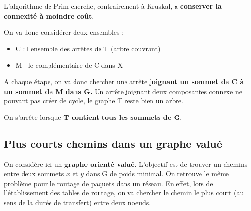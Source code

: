 L'algorithme de Prim cherche, contrairement à Kruskal, à \textbf{conserver la connexité à moindre coût}. 

On va donc considérer deux ensembles :
\begin{itemize}
    \item C : l'ensemble des arrêtes de T (arbre couvrant)
    \item M : le complémentaire de C dans X 
\end{itemize}

A chaque étape, on va donc chercher une arrête \textbf{joignant un sommet de C à un sommet de M dans G. }
Un arrête joignant deux composantes connexe ne pouvant pas créer de cycle, le graphe T reste bien un arbre. 

On s'arrête lorsque \textbf{T contient tous les sommets de G}. 


\begin{comment}
    \begin{lstlisting}
    {Initialisations}
    T:=[];m:=0;
    M:=[];
    connexe:=vrai
    Pour i de 1 à n faire
        DIST[i]:=p(x,i); {S’il n’y a pas d’arete (x,i) p(x,i) renv
        MIN[i]:=x
        Si i<>x alors ajouterfin(i,M)

    Tant que connexe et m<n-1 faire
        {(1) chercher l’arête (y,z) de poids minimal telle que y soit dans C et z dans M}
        z:=min(DIST); {pas la valeur mais l’indice}
        si z=0 {toutes les valeurs de DIST sont infinies} alors c
        Debut
        enlever(z,M);
        y:=MIN[z];
        u:=(yz);
        Ajouterfin(u,T);
        m:=m+1;
    \end{lstlisting}
\end{comment}


\subsection{Plus courts chemins dans un graphe valué}

On considère ici un \textbf{graphe orienté valué}. 
L'objectif est de trouver un chemins entre deux sommets $x$ et $y$ dans G de poids minimal. 
On retrouve le même problème pour le routage de paquets dans un réseau. En effet, lors de l'établissement 
des tables de routage, on va chercher le chemin le plus court (au sens de la durée de transfert) entre deux noeuds. 


